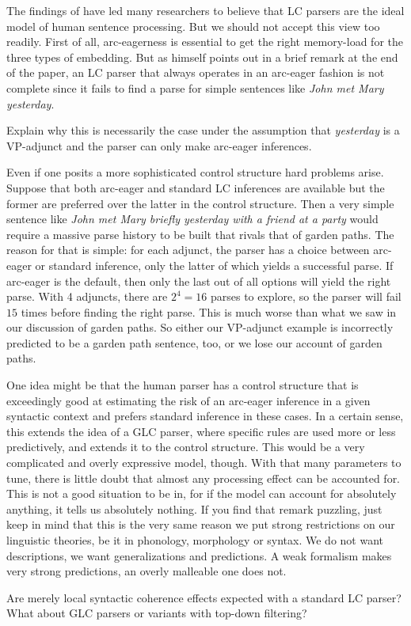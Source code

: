 The findings of \citet{Resnik92} have led many researchers to believe that LC parsers are the ideal model of human sentence processing.
But we should not accept this view too readily.
First of all, arc-eagerness is essential to get the right memory-load for the three types of embedding.
But as \citeauthor{Resnik92} himself points out in a brief remark at the end of the paper, an LC parser that always operates in an arc-eager fashion is not complete since it fails to find a parse for simple sentences like \emph{John met Mary yesterday}.
%
\begin{exercise}
    Explain why this is necessarily the case under the assumption that \emph{yesterday} is a VP-adjunct and the parser can only make arc-eager inferences.
\end{exercise}

Even if one posits a more sophisticated control structure hard problems arise.
Suppose that both arc-eager and standard LC inferences are available but the former are preferred over the latter in the control structure.
Then a very simple sentence like \emph{John met Mary briefly yesterday with a friend at a party} would require a massive parse history to be built that rivals that of garden paths.
The reason for that is simple: for each adjunct, the parser has a choice between arc-eager or standard inference, only the latter of which yields a successful parse.
If arc-eager is the default, then only the last out of all options will yield the right parse.
With 4 adjuncts, there are $2^4 = 16$ parses to explore, so the parser will fail $15$ times before finding the right parse.
This is much worse than what we saw in our discussion of garden paths.
So either our VP-adjunct example is incorrectly predicted to be a garden path sentence, too, or we lose our account of garden paths.

One idea might be that the human parser has a control structure that is exceedingly good at estimating the risk of an arc-eager inference in a given syntactic context and prefers standard inference in these cases.
In a certain sense, this extends the idea of a GLC parser, where specific rules are used more or less predictively, and extends it to the control structure.
This would be a very complicated and overly expressive model, though.
With that many parameters to tune, there is little doubt that almost any processing effect can be accounted for.
This is not a good situation to be in, for if the model can account for absolutely anything, it tells us absolutely nothing.
If you find that remark puzzling, just keep in mind that this is the very same reason we put strong restrictions on our linguistic theories, be it in phonology, morphology or syntax.
We do not want descriptions, we want generalizations and predictions.
A weak formalism makes very strong predictions, an overly malleable one does not.

\begin{exercise}
    Are merely local syntactic coherence effects expected with a standard LC parser?
    What about GLC parsers or variants with top-down filtering?
\end{exercise}



